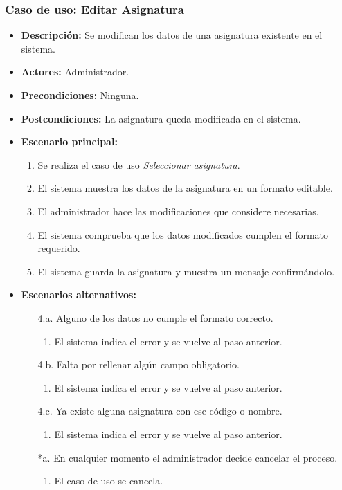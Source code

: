 \documentclass{book}
\begin{document}
\subsubsection*{Caso de uso: Editar Asignatura}
\begin{itemize}
\item{\bf Descripción:} Se modifican los datos de una asignatura existente en el sistema.
\item{\bf Actores:} Administrador.
\item{\bf Precondiciones:} Ninguna.
\item{\bf Postcondiciones:} La asignatura queda modificada en el sistema.
\item{\bf Escenario principal:}
	\begin{enumerate}
	\item Se realiza el caso de uso {\em \hyperref[select_asignatura]{Seleccionar asignatura}}.
	\item El sistema muestra los datos de la asignatura en un formato editable.
	\item El administrador hace las modificaciones que considere necesarias.
	\item El sistema comprueba que los datos modificados cumplen el formato requerido.
	\item El sistema guarda la asignatura y muestra un mensaje confirmándolo.
	\end{enumerate}
\item{\bf Escenarios alternativos:}
	\begin{itemize}
	\item[4.a.] Alguno de los datos no cumple el formato correcto.
		\begin{enumerate}
		\item El sistema indica el error y se vuelve al paso anterior.
		\end{enumerate}
	\item[4.b.] Falta por rellenar algún campo obligatorio.
		\begin{enumerate}
		\item El sistema indica el error y se vuelve al paso anterior.
		\end{enumerate}
	\item[4.c.] Ya existe alguna asignatura con ese código o nombre.
		\begin{enumerate}
		\item El sistema indica el error y se vuelve al paso anterior.
		\end{enumerate}
	\item[*a.] En cualquier momento el administrador decide cancelar el proceso.
		\begin{enumerate}
		\item El caso de uso se cancela.
		\end{enumerate}
	\end{itemize}
\end{itemize}
\end{document}
